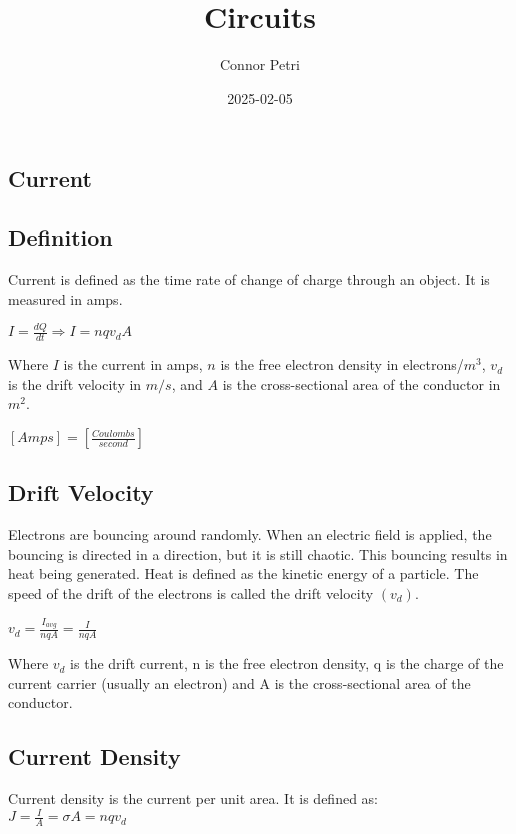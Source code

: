 \documentclass[12pt]{article}
\title{Circuits}
\author{Connor Petri}
\date{2025-02-05}
\begin{document}
\maketitle
\tableofcontents
\pagebreak



\begin{center}
\section{Current}
\end{center}

\subsection*{Definition}
\hspace{.5cm} Current is defined as the time rate of change of charge through an object. It is measured in amps.

\vbox{
    \large\center
    $I=\frac{dQ}{dt} \Rightarrow I = nqv_dA$
}\vspace{12pt}

Where $I$ is the current in amps, $n$ is the free electron density in electrons/$m^3$, 
$v_d$ is the drift velocity in $m/s$, and $A$ is the cross-sectional area of the conductor in $m^2$.

\vbox {
    \large\center
    $[Amps] = [\frac{Coulombs}{second}]$
}


\subsection*{Drift Velocity}
Electrons are bouncing around randomly. When an electric field is applied, the bouncing is directed 
in a direction, but it is still chaotic. This bouncing results in heat being generated. Heat is defined 
as the kinetic energy of a particle. The speed of the drift of the electrons is called the drift velocity $(v_d)$.

\vbox{
    \large\center
    $v_d = \frac{I_{avg}}{nqA} = \frac{I}{nqA}$\\
}\vspace{12pt}

Where $v_d$ is the drift current, n is the free electron density, q is the charge of the current carrier 
(usually an electron) and A is the cross-sectional area of the conductor.

\pagebreak



\subsection*{Current Density}
\hspace{.5cm} Current density is the current per unit area. It is defined as:\\
\vbox{
    \large\center
    $J = \frac{I}{A} = \sigma A = nqv_d$
}\vspace{12pt}
\end{document}
